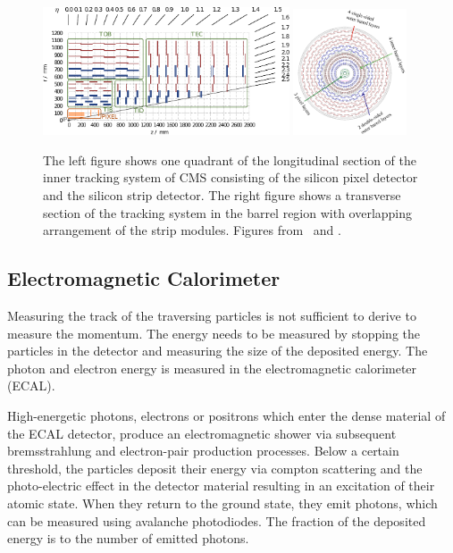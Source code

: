 \begin{figure}[htb]
    \centering
    \includegraphics[width=0.65\textwidth]{figures/cms_detector/tracker.pdf}\hfill
    \includegraphics[width=0.3\textwidth]{figures/cms_detector/tracking_sytem_barrel_slice.png}
    \caption[Inner Tracking System]{The left figure shows one quadrant of the
        longitudinal section of the inner tracking system of CMS consisting of the
        silicon pixel detector and the silicon strip detector. The right figure shows a
        transverse section of the tracking system in the barrel region with overlapping
        arrangement of the strip modules. Figures from~\cite{phd:joramberger} and
        \cite{cmsweb:innertracker}.}
    \label{fig:cms:inner_tracking}
\end{figure}

\subsection{Electromagnetic Calorimeter}

Measuring the track of the traversing particles is not sufficient to derive to
measure the momentum. The energy needs to be measured by stopping the particles
in the detector and measuring the size of the deposited energy. The photon and
electron energy is measured in the electromagnetic calorimeter (ECAL). 

High-energetic photons, electrons or positrons which enter the dense material of the ECAL
detector, produce an electromagnetic shower via subsequent bremsstrahlung and
electron-pair production processes. Below a certain threshold, the particles
deposit their energy via compton scattering and the photo-electric effect in the
detector material resulting in an excitation of their atomic state. When they
return to the ground state, they emit photons, which can be measured using
avalanche photodiodes. The fraction of the deposited energy is to the number of
emitted photons.

